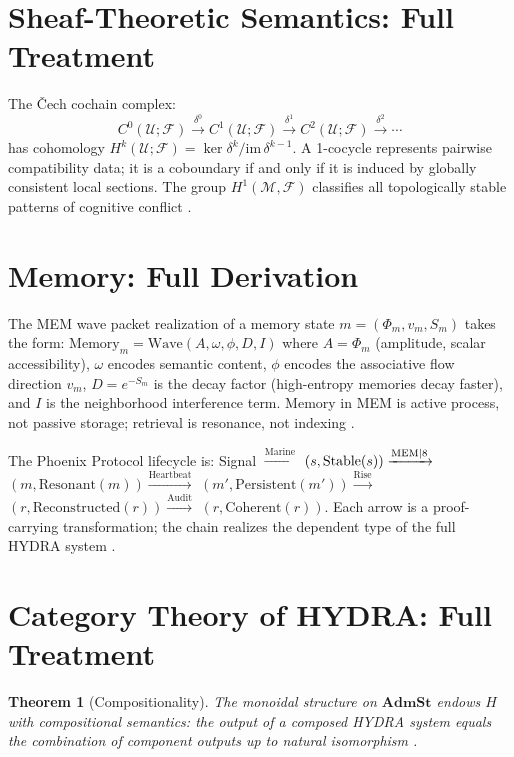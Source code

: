 \documentclass[12pt, a4paper]{article}
\theoremstyle{rsvpstyle}
\newtheorem{theorem}{Theorem}[section]
\theoremstyle{definition}
\newcommand{\OpMan}{\mathcal{M}}
\begin{document}
\section{Sheaf-Theoretic Semantics: Full Treatment}

The \v{C}ech cochain complex:
\begin{equation}
  C^0(\mathcal{U};\mathcal{F}) \xrightarrow{\delta^0} C^1(\mathcal{U};\mathcal{F})
  \xrightarrow{\delta^1} C^2(\mathcal{U};\mathcal{F}) \xrightarrow{\delta^2} \cdots
\end{equation}
has cohomology $H^k(\mathcal{U};\mathcal{F}) = \ker\delta^k/\mathrm{im}\,\delta^{k-1}$.
A 1-cocycle represents pairwise compatibility data; it is a coboundary if and
only if it is induced by globally consistent local sections. The group
$H^1(\OpMan,\mathcal{F})$ classifies all topologically stable patterns of
cognitive conflict \citep{Hatcher2002,Godement1958,KashiwaraSchapira1990}.

\section{Memory: Full Derivation}

The MEM wave packet realization of a memory state
$m = (\Phi_m, v_m, S_m)$ takes the form:
$\mathrm{Memory}_m = \mathrm{Wave}(A, \omega, \phi, D, I)$
where $A = \Phi_m$ (amplitude, scalar accessibility), $\omega$ encodes semantic
content, $\phi$ encodes the associative flow direction $v_m$, $D = e^{-S_m}$
is the decay factor (high-entropy memories decay faster), and $I$ is the
neighborhood interference term. Memory in MEM is active process, not
passive storage; retrieval is resonance, not indexing \citep{WilsonCowan1972}.

The Phoenix Protocol lifecycle is: Signal $\xrightarrow{\text{Marine}}$
$(s, \mathrm{Stable}(s)) \xrightarrow{\text{MEM\textbar8}}$
$(m, \mathrm{Resonant}(m)) \xrightarrow{\text{Heartbeat}}$
$(m', \mathrm{Persistent}(m')) \xrightarrow{\text{Rise}}$
$(r, \mathrm{Reconstructed}(r)) \xrightarrow{\text{Audit}}$
$(r, \mathrm{Coherent}(r))$.
Each arrow is a proof-carrying transformation; the chain realizes the dependent
type of the full HYDRA system \citep{CurryHoward}.

\section{Category Theory of HYDRA: Full Treatment}

\begin{theorem}[Compositionality]
The monoidal structure on $\mathbf{AdmSt}$ endows $H$ with compositional
semantics: the output of a composed HYDRA system equals the combination of
component outputs up to natural isomorphism \citep{EilenbergMacLane1945}.
\end{theorem}
\end{document}
